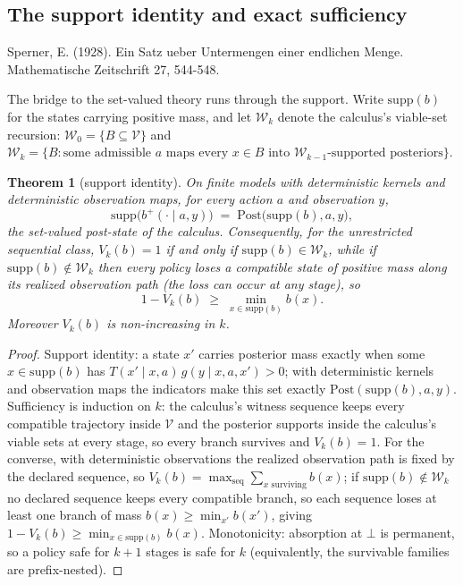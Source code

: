 \documentclass[10pt,twocolumn]{article}
\theoremstyle{plain}
\newtheorem{theorem}{Theorem}
\theoremstyle{definition}
\theoremstyle{remark}
\begin{document}
\subsection{The support identity and exact sufficiency}\label{support}
Sperner, E. (1928). Ein Satz ueber Untermengen einer endlichen Menge.
Mathematische Zeitschrift 27, 544-548.


The bridge to the set-valued theory runs through the support. Write
\(\mathrm{supp}(b)\) for the states carrying positive mass, and let
\(\mathcal{W}_{k}\) denote the calculus's viable-set recursion:
\(\mathcal{W}_{0} = \{B \subseteq \mathcal{V}\}\) and
\(\mathcal{W}_{k} = \{B : \text{some admissible } a \text{ maps every }
x \in B \text{ into } \mathcal{W}_{k-1}\text{-supported posteriors}\}\).

\begin{theorem}[support identity]\label{thm:support}
On finite models with deterministic kernels and deterministic
observation maps, for every action \(a\) and
observation \(y\),
\[
\mathrm{supp}\bigl(b^{+}(\cdot \mid a, y)\bigr)
\;=\; \mathrm{Post}\bigl(\mathrm{supp}(b), a, y\bigr),
\]
the set-valued post-state of the calculus. Consequently, for the
unrestricted sequential class,
\(V_{k}(b) = 1\) if and only if
\(\mathrm{supp}(b) \in \mathcal{W}_{k}\), while if
\(\mathrm{supp}(b) \notin \mathcal{W}_{k}\) then every policy loses a
compatible state of positive mass along its realized observation path
(the loss can occur at any stage), so
\[
1 - V_{k}(b) \;\ge\; \min_{x \in \mathrm{supp}(b)} b(x).
\]
Moreover \(V_{k}(b)\) is non-increasing in \(k\).\end{theorem}

\begin{proof}
Support identity: a state \(x'\) carries posterior mass exactly when
some \(x \in \mathrm{supp}(b)\) has
\(T(x' \mid x, a)\, g(y \mid x, a, x') > 0\); with deterministic
kernels and observation maps the indicators make this set exactly
\(\mathrm{Post}(\mathrm{supp}(b), a, y)\). Sufficiency is induction on
\(k\): the calculus's witness sequence keeps every compatible trajectory
inside \(\mathcal{V}\) and the posterior supports inside the calculus's
viable sets at every stage, so every branch survives and
\(V_{k}(b) = 1\). For the converse, with deterministic observations the
realized observation path is fixed by the declared sequence, so
\(V_{k}(b) = \max_{\text{seq}} \sum_{x \text{ surviving}} b(x)\); if
\(\mathrm{supp}(b) \notin \mathcal{W}_{k}\) no declared sequence keeps
every compatible branch, so each sequence loses at least one branch of
mass \(b(x) \ge \min_{x'} b(x')\), giving
\(1 - V_{k}(b) \ge \min_{x \in \mathrm{supp}(b)} b(x)\). Monotonicity:
absorption at \(\bot\) is permanent, so a policy safe for \(k+1\)
stages is safe for \(k\) (equivalently, the survivable families are
prefix-nested).
\end{proof}
\end{document}
